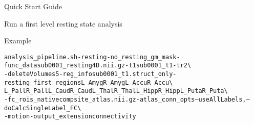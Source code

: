 \documentclass[]{report}
\begin{document}
\begin{chapter}{Quick Start Guide }
\begin{section}{Run a first level resting state analysis}
\begin{description}
\end{description}



\begin{subsubsection}{Example}
\begin{alltt}
analysis\_pipeline.sh -resting -no_resting_gm_mask -func\_data sub0001\_resting4D.nii.gz -t1 sub0001_t1  -tr 2  \textbackslash  \\
\hspace*{0.5in} -deleteVolumes 5 -reg_info sub0001\_t1.struct_only -resting_first_regions L\_Amyg R\_Amyg L\_Accu R\_Accu \textbackslash  \\
\hspace*{0.5in} L\_Pall   R\_Pall L\_Caud R\_Caud L\_Thal R\_Thal L\_Hipp R\_Hipp L\_Puta R\_Puta   \textbackslash  \\
\hspace*{0.5in} -fc\_rois\_native compsite_atlas.nii.gz -atlas_conn_opts --useAllLabels,--doCalcSingleLabel\_FC   \textbackslash  \\
\hspace*{0.5in} -motion -output_extension connectivity
\end{alltt}
\end{subsubsection}

\end{section}


\end{chapter}
\end{document}
